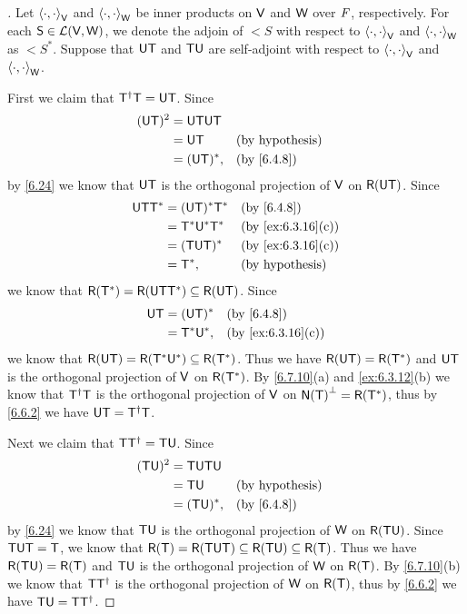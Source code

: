 \begin{proof}[]
  Let \(\left\langle\cdot, \cdot\right\rangle_{\mathsf{V}}\) and \(\left\langle\cdot, \cdot\right\rangle_{\mathsf{W}}\) be inner products on \(\mathsf{V}\) and \(\mathsf{W}\) over \(\mathit{F}\), respectively.
  For each \(\mathsf{S} \in \mathcal{L}(\mathsf{V}, \mathsf{W})\), we denote the adjoin of \(\lt{S}\) with respect to \(\left\langle\cdot, \cdot\right\rangle_{\mathsf{V}}\) and \(\left\langle\cdot, \cdot\right\rangle_{\mathsf{W}}\) as \(\lt{S}^*\).
  Suppose that \(\mathsf{U} \mathsf{T}\) and \(\mathsf{T} \mathsf{U}\) are self-adjoint with respect to \(\left\langle\cdot, \cdot\right\rangle_{\mathsf{V}}\) and \(\left\langle\cdot, \cdot\right\rangle_{\mathsf{W}}\).

  First we claim that \(\mathsf{T}^{\dag} \mathsf{T} = \mathsf{U} \mathsf{T}\).
  Since
  \begin{align*}
    (\U \T)^2 & = \U \T \U \T                             \\
              & = \U \T       &  & \text{(by hypothesis)} \\
              & = (\U \T)^*,  &  & \by{6.4.8}
  \end{align*}
  by \cref{6.24} we know that \(\mathsf{U} \mathsf{T}\) is the orthogonal projection of \(\mathsf{V}\) on \(\rg{\U \T}\).
  Since
  \begin{align*}
    \U \T \T^* & = (\U \T)^* \T^* &  & \by{6.4.8}             \\
               & = \T^* \U^* \T^* &  & \by{ex:6.3.16}[c]      \\
               & = (\T \U \T)^*   &  & \by{ex:6.3.16}[c]      \\
               & = \T^*,          &  & \text{(by hypothesis)}
  \end{align*}
  we know that \(\rg{\T^*} = \rg{\U \T \T^*} \subseteq \rg{\U \T}\).
  Since
  \begin{align*}
    \U \T & = (\U \T)^*  &  & \by{6.4.8}        \\
          & = \T^* \U^*, &  & \by{ex:6.3.16}[c]
  \end{align*}
  we know that \(\rg{\U \T} = \rg{\T^* \U^*} \subseteq \rg{\T^*}\).
  Thus we have \(\rg{\U \T} = \rg{\T^*}\) and \(\mathsf{U} \mathsf{T}\) is the orthogonal projection of \(\mathsf{V}\) on \(\rg{\T^*}\).
  By \cref{6.7.10}(a) and \cref{ex:6.3.12}(b) we know that \(\mathsf{T}^{\dag} \mathsf{T}\) is the orthogonal projection of \(\mathsf{V}\) on \(\ns{\T}^{\perp} = \rg{\T^*}\), thus by \cref{6.6.2} we have \(\mathsf{U} \mathsf{T} = \mathsf{T}^{\dag} \mathsf{T}\).

  Next we claim that \(\mathsf{T} \mathsf{T}^{\dag} = \mathsf{T} \mathsf{U}\).
  Since
  \begin{align*}
    (\T \U)^2 & = \T \U \T \U                             \\
              & = \T \U       &  & \text{(by hypothesis)} \\
              & = (\T \U)^*,  &  & \by{6.4.8}
  \end{align*}
  by \cref{6.24} we know that \(\mathsf{T} \mathsf{U}\) is the orthogonal projection of \(\mathsf{W}\) on \(\rg{\T \U}\).
  Since \(\mathsf{T} \mathsf{U} \mathsf{T} = \mathsf{T}\), we know that \(\rg{\T} = \rg{\T \U \T} \subseteq \rg{\T \U} \subseteq \rg{\T}\).
  Thus we have \(\rg{\T \U} = \rg{\T}\) and \(\mathsf{T} \mathsf{U}\) is the orthogonal projection of \(\mathsf{W}\) on \(\rg{\T}\).
  By \cref{6.7.10}(b) we know that \(\mathsf{T} \mathsf{T}^{\dag}\) is the orthogonal projection of \(\mathsf{W}\) on \(\rg{\T}\), thus by \cref{6.6.2} we have \(\mathsf{T} \mathsf{U} = \mathsf{T} \mathsf{T}^{\dag}\).


\end{proof}
